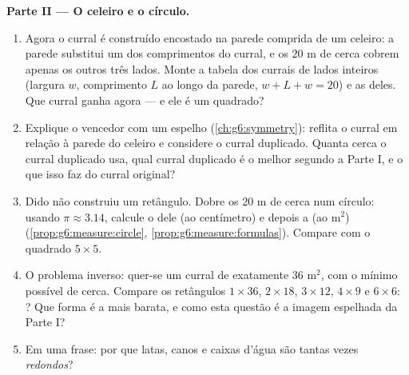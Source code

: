 \begin{problem}
\medskip
\noindent\textbf{Parte II --- O celeiro e o círculo.}
\begin{enumerate}[resume]
  \item Agora o curral é construído encostado na parede comprida de um
        celeiro: a parede substitui um dos comprimentos do curral, e os
        $20$ m de cerca cobrem apenas os outros três lados. Monte a
        tabela dos currais de lados inteiros (largura $w$, comprimento
        $L$ ao longo da parede, $w + L + w = 20$) e as  deles. Que
        curral ganha agora --- e ele é um quadrado?
  \item Explique o vencedor com um espelho (\cref{ch:g6:symmetry}):
        reflita o curral em relação à parede do celeiro e considere o
        curral duplicado. Quanta cerca o curral duplicado usa, qual
        curral duplicado é o melhor segundo a Parte I, e o que isso faz
        do curral original?
  \item Dido não construiu um retângulo. Dobre os $20$ m de cerca num
        círculo: usando $\pi \approx 3.14$, calcule o  dele (ao
        centímetro) e depois a  (ao m$^2$)
        (\cref{prop:g6:measure:circle},
        \cref{prop:g6:measure:formulas}). Compare com o quadrado
        $5 \times 5$.
  \item O problema inverso: quer-se um curral de  exatamente
        $36$ m$^2$, com o mínimo possível de cerca. Compare os
        retângulos $1 \times 36$, $2 \times 18$, $3 \times 12$,
        $4 \times 9$ e $6 \times 6$: ? Que forma é a mais
        barata, e como esta questão é a imagem espelhada da Parte I?
  \item Em uma frase: por que latas, canos e caixas d'água são tantas
        vezes \emph{redondos}?
\end{enumerate}


\end{problem}
